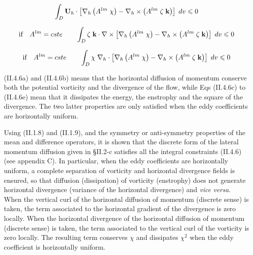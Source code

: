 \documentclass[../tex_main/NEMO_manual]{subfiles}
\begin{document}
\begin{equation} \label{eq:dynldf_curl}
\int_D {{\rm {\bf U}}_h \cdot \left[ {\nabla _h \left( {A^{lm}\;\chi } 
\right)-\nabla _h \times \left( {A^{lm}\;\zeta \;{\rm {\bf k}}} \right)} 
\right]\;dv} \leqslant 0
\end{equation}

\begin{equation} \label{eq:dynldf_curl2}
\mbox{if}\quad A^{lm}=cste\quad \quad \int_D {\zeta \;{\rm {\bf k}}\cdot 
\nabla \times \left[ {\nabla _h \left( {A^{lm}\;\chi } \right)-\nabla _h 
\times \left( {A^{lm}\;\zeta \;{\rm {\bf k}}} \right)} \right]\;dv} 
\leqslant 0
\end{equation}

\begin{equation} \label{eq:dynldf_div2}
\mbox{if}\quad A^{lm}=cste\quad \quad \int_D {\chi \;\nabla _h \cdot \left[ 
{\nabla _h \left( {A^{lm}\;\chi } \right)-\nabla _h \times \left( 
{A^{lm}\;\zeta \;{\rm {\bf k}}} \right)} \right]\;dv} \leqslant 0
\end{equation}


(II.4.6a) and (II.4.6b) means that the horizontal diffusion of momentum 
conserve both the potential vorticity and the divergence of the flow, while 
Eqs (II.4.6c) to (II.4.6e) mean that it dissipates the energy, the enstrophy 
and the square of the divergence. The two latter properties are only 
satisfied when the eddy coefficients are horizontally uniform.

Using (II.1.8) and (II.1.9), and the symmetry or anti-symmetry properties of 
the mean and difference operators, it is shown that the discrete form of the 
lateral momentum diffusion given in {\S}II.2-c satisfies all the integral 
constraints (II.4.6) (see appendix C). In particular, when the eddy 
coefficients are horizontally uniform, a complete separation of vorticity 
and horizontal divergence fields is ensured, so that diffusion (dissipation) 
of vorticity (enstrophy) does not generate horizontal divergence (variance 
of the horizontal divergence) and \textit{vice versa}. When the vertical curl of the horizontal 
diffusion of momentum (discrete sense) is taken, the term associated to the 
horizontal gradient of the divergence is zero locally. When the horizontal 
divergence of the horizontal diffusion of momentum (discrete sense) is 
taken, the term associated to the vertical curl of the vorticity is zero 
locally. The resulting term conserves $\chi$ and dissipates 
$\chi^2$ when the 
eddy coefficient is horizontally uniform.
\end{document}
